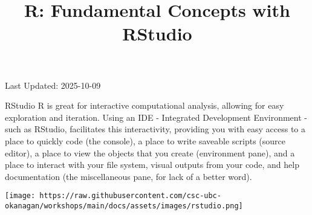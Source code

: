\documentclass[
  ignorenonframetext,
]{beamer}
\title{R: Fundamental Concepts with RStudio}
\author{}
\date{\vspace{-2.5em}}
\begin{document}
\frame{\titlepage}

\begin{frame}
Last Updated: 2025-10-09
\end{frame}

\begin{frame}{RStudio}
\protect\hypertarget{rstudio}{}
R is great for interactive computational analysis, allowing for easy
exploration and iteration. Using an IDE - Integrated Development
Environment - such as RStudio, facilitates this interactivity, providing
you with easy access to a place to quickly code (the console), a place
to write saveable scripts (source editor), a place to view the objects
that you create (environment pane), and a place to interact with your
file system, visual outputs from your code, and help documentation (the
miscellaneous pane, for lack of a better word).

\texttt{[image: https://raw.githubusercontent.com/csc-ubc-okanagan/workshops/main/docs/assets/images/rstudio.png]}
\end{frame}
\end{document}
